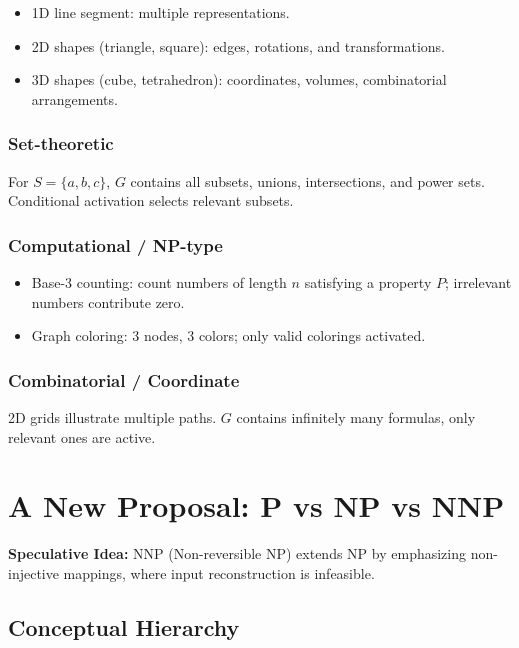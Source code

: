 \documentclass[12pt]{article}
\begin{document}
\begin{itemize}
    \item 1D line segment: multiple representations.
    \item 2D shapes (triangle, square): edges, rotations, and transformations.
    \item 3D shapes (cube, tetrahedron): coordinates, volumes, combinatorial arrangements.
\end{itemize}

\subsubsection{Set-theoretic}

For $S = \{a,b,c\}$, $G$ contains all subsets, unions, intersections, and power sets. Conditional activation selects relevant subsets.

\subsubsection{Computational / NP-type}

\begin{itemize}
    \item Base-3 counting: count numbers of length $n$ satisfying a property $P$; irrelevant numbers contribute zero.
    \item Graph coloring: 3 nodes, 3 colors; only valid colorings activated.
\end{itemize}

\subsubsection{Combinatorial / Coordinate}

2D grids illustrate multiple paths. $G$ contains infinitely many formulas, only relevant ones are active.

\newpage

\section{A New Proposal: P vs NP vs NNP}

\textbf{Speculative Idea:} NNP (Non-reversible NP) extends NP by emphasizing non-injective mappings, where input reconstruction is infeasible.

\subsection{Conceptual Hierarchy}
\end{document}
